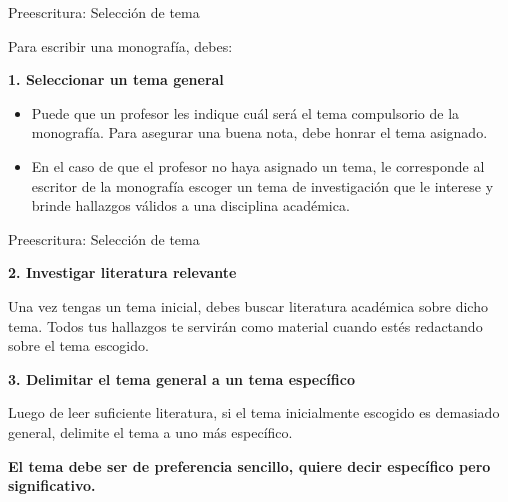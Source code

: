 \documentclass[
11pt, %
]{beamer}
\begin{document}
\begin{frame}{Preescritura: Selección de tema}

	Para escribir una monografía, debes:

	\textbf{1. Seleccionar un tema general}
	\begin{itemize}
		\item Puede que un profesor les indique cuál será el tema compulsorio de la monografía. Para asegurar una buena nota, debe honrar el tema asignado.
		\item En el caso de que el profesor no haya asignado un tema, le corresponde al escritor de la monografía escoger un tema de investigación que le interese y brinde hallazgos válidos a una disciplina académica.
	\end{itemize}

\end{frame}

\begin{frame}{Preescritura: Selección de tema}

	\textbf{2. Investigar literatura relevante}

	Una vez tengas un tema inicial, debes buscar literatura académica sobre dicho
	tema. Todos tus hallazgos te servirán como material cuando estés redactando
	sobre el tema escogido.

	\vspace{0.5cm}

	\textbf{3. Delimitar el tema general a un tema específico}

	Luego de leer suficiente literatura, si el tema inicialmente escogido es
	demasiado general, delimite el tema a uno más específico.

	\vspace{0.5cm}

	\textbf{El tema debe ser de preferencia sencillo, quiere decir específico pero significativo.}

\end{frame}
\end{document}
